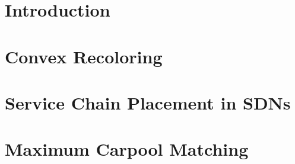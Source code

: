 \newcommand{\defpath}[1]{\def\path{content/#1}}
\newcommand{\add}[1]{}

\chapter{Introduction}
\defpath{introduction}
\add{introduction}

\chapter{Convex Recoloring}
\defpath{2cr}
\add{2cr}

\chapter{Service Chain Placement in SDNs}
\defpath{vpn}
\add{vpn}

\chapter{Maximum Carpool Matching}
\defpath{carpool}
\add{carpool}


